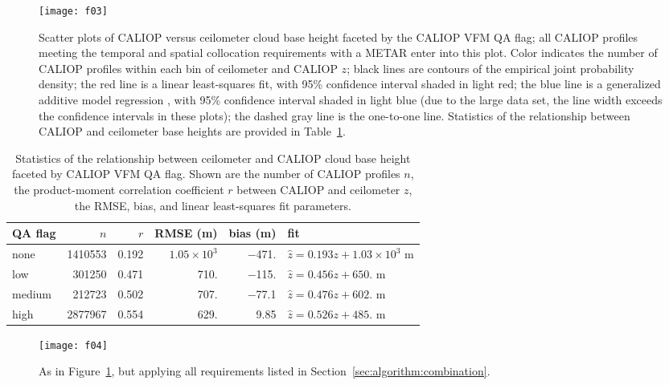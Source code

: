 \documentclass[essd,manuscript]{copernicus}
\begin{document}
\begin{figure*}
{\centering \texttt{[image: f03]} 

}
  \caption{Scatter plots of CALIOP versus ceilometer cloud base height faceted
    by the CALIOP VFM QA flag; all CALIOP profiles meeting the temporal and
    spatial collocation requirements with a METAR enter into this plot.  Color
    indicates the number of CALIOP profiles within each bin of ceilometer and
    CALIOP \ensuremath{z}{}; black lines are contours of the empirical joint probability
    density; the red line is a linear least-squares fit, with 95\% confidence
    interval shaded in light red; the blue line is a generalized additive model
    regression \citep{Wood2011}, with 95\% confidence interval shaded in light
    blue (due to the large data set, the line width exceeds the confidence
    intervals in these plots); the dashed gray line is the one-to-one line.
    Statistics of the relationship between CALIOP and ceilometer base heights
    are provided in Table~\ref{tab:quality-qa}.}
  \label{fig:quality-qa}
\end{figure*}

\begin{table*}
  \centering
  \caption{Statistics of the relationship between ceilometer and CALIOP cloud
    base height faceted by CALIOP VFM QA flag.  Shown are the number of CALIOP
    profiles $n$, the product-moment correlation coefficient $r$ between CALIOP
    and ceilometer \ensuremath{z}{}, the RMSE, bias, and linear least-squares
    fit parameters.}
  \label{tab:quality-qa}
\begin{tabular}{lrrrrl}
  \hline
\hline
QA flag & $n$ & $r$ & RMSE (m) & bias (m) & fit \\ 
  \hline
none & 1410553 & 0.192 & $1.05 \times 10^{3}$ & $-$471. & $\hat{z} = 0.193 z + \ensuremath{1.03 \times 10^{3}}$ m \\ 
  low & 301250 & 0.471 & 710. & $-$115. & $\hat{z} = 0.456 z + 650.$ m \\ 
  medium & 212723 & 0.502 & 707. & $-$77.1 & $\hat{z} = 0.476 z + 602.$ m \\ 
  high & 2877967 & 0.554 & 629. & 9.85 & $\hat{z} = 0.526 z + 485.$ m \\ 
   \hline
\hline
\end{tabular}

\end{table*}

\begin{figure*}
{\centering \texttt{[image: f04]}

}
  \caption{As in Figure~\ref{fig:quality-qa}, but applying all 
    requirements listed in Section~\ref{sec:algorithm:combination}.}
  \label{fig:quality-qa-other-cuts}
\end{figure*}
\end{document}
